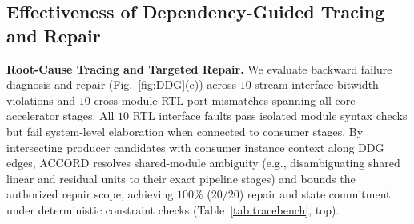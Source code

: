 \documentclass[9pt,conference]{IEEEtran}
\begin{document}
\begin{table}[t]
\centering
\caption{Dependency-Guided Failure Tracing, Repair, and Incremental Revalidation.}
\label{tab:tracebench}
\vspace{-6pt}
\end{table}

\subsection{Effectiveness of Dependency-Guided Tracing and Repair}
\textbf{Root-Cause Tracing and Targeted Repair.}
We evaluate backward failure diagnosis and repair (Fig.~\ref{fig:DDG}(c)) across $10$ stream-interface bitwidth violations and $10$ cross-module RTL port mismatches spanning all core accelerator stages. All $10$ RTL interface faults pass isolated module syntax checks but fail system-level elaboration when connected to consumer stages. By intersecting producer candidates with consumer instance context along DDG edges, ACCORD resolves shared-module ambiguity (e.g., disambiguating shared linear and residual units to their exact pipeline stages) and bounds the authorized repair scope, achieving $100\%$ ($20/20$) repair and state commitment under deterministic constraint checks (Table~\ref{tab:tracebench}, top).
\end{document}
